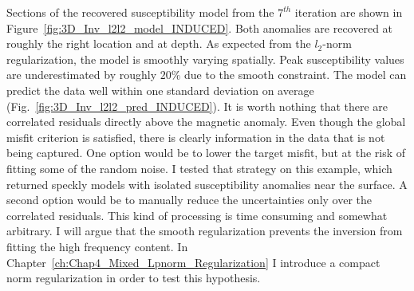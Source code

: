 Sections of the recovered susceptibility model from the $7^{th}$ iteration are shown in Figure~\ref{fig:3D_Inv_l2l2_model_INDUCED}. 
Both anomalies are recovered at roughly the right location and at depth. 
As expected from the $l_2$-norm regularization, the model is smoothly varying spatially. Peak susceptibility values are underestimated by roughly $20\%$ due to the smooth constraint.
The model can predict the data well within one standard deviation on average (Fig.~\ref{fig:3D_Inv_l2l2_pred_INDUCED}).
It is worth nothing that there are correlated residuals directly above the magnetic anomaly.
Even though the global misfit criterion is satisfied, there is clearly information in the data that is not being captured.
One option would be to lower the target misfit, but at the risk of fitting some of the random noise.
I tested that strategy on this example, which returned speckly models with isolated susceptibility anomalies near the surface.
A second option would be to manually reduce the uncertainties only over the correlated residuals.
This kind of processing is time consuming and somewhat arbitrary. 
I will argue that the smooth regularization prevents the inversion from fitting the high frequency content.
In Chapter~\ref{ch:Chap4_Mixed_Lpnorm_Regularization} I introduce a compact norm regularization in order to test this hypothesis.


